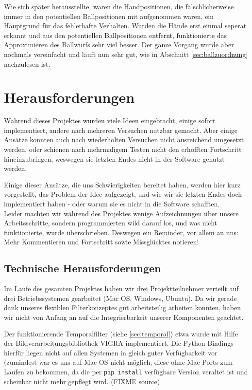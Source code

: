 \documentclass[12pt,a4paper,ngerman]{scrartcl}
\begin{document}
Wie sich später herausstellte, waren die Handpositionen, die fälschlicherweise immer in den potentiellen Ballpositionen mit aufgenommen waren, ein Hauptgrund für das fehlerhafte Verhalten. Wurden die Hände erst einmal seperat erkannt und aus den potentiellen Ballpositionen entfernt, funktionierte das Approximieren des Ballwurfs sehr viel besser. Der ganze Vorgang wurde aber nochmals vereinfacht und läuft nun sehr gut, wie in Abschnitt \ref{sec:ballzuordnung} nachzulesen ist.

\section{Herausforderungen}
Während dieses Projektes wurden viele Ideen eingebracht, einige sofort implementiert, andere nach mehreren Versuchen nutzbar gemacht. Aber einige Ansätze konnten auch nach wiederholten Versuchen nicht ausreichend umgesetzt werden, oder schienen nach mehrmaligem Testen nicht den erhofften Fortschritt hineinzubringen, weswegen sie letzten Endes nicht in der Software genutzt werden.

Einige dieser Ansätze, die uns Schwierigkeiten bereitet haben, werden hier kurz vorgestellt, das Problem der Idee aufgezeigt, und wie wir sie letzten Endes doch implementiert haben - oder warum sie es nicht in die Software schafften.\\
Leider machten wir während des Projektes wenige Aufzeichnungen über unsere Arbeitsschritte, sondern programmierten wild darauf los, und was nicht funktionierte, wurde überschrieben. Deswegen ein Reminder, vor allem an uns: Mehr Kommentieren und Fortschritt sowie Missglücktes notieren!


\subsection{Technische Herausforderungen}

Im Laufe des gesamten Projektes haben wir drei Projektteilnehmer verteilt auf drei
Betriebssystemen gearbeitet (Mac OS, Windows, Ubuntu). Da wir gerade dank
unseres flexiblen Filterkonzeptes gut arbeitsteilig arbeiten konnten, haben wir
nicht von Anfang an auf die Integrierbarkeit unserer Komponenten geachtet.

Der funktionierende Temporalfilter (siehe \ref{sec:temporal}) etwa wurde mit Hilfe
der Bildverarbeitungsbibliothek VIGRA\cite{vigra} implementiert. Die
Python-Bindings hierfür liegen nicht auf allen Systemen in gleich guter Verfügbarkeit
vor (zumindest war es uns auf Mac OS nicht möglich, diese ohne Mac Ports zum Laufen
zu bekommen, da die per \lstinline{pip install} verfügbare Version veraltet ist und
scheinbar nicht mehr gepflegt wird. (FIXME source)
\end{document}
